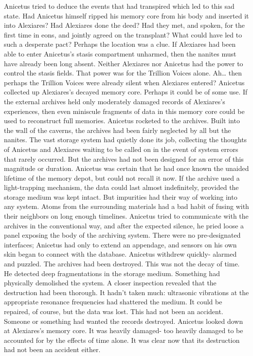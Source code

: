\documentclass[a4paper]{article}
\begin{document}
Anicetus tried to deduce the events that had transpired which led to this sad state. Had Anicetus himself ripped his memory core from his body and inserted it into Alexiares? Had Alexiares done the deed? Had they met, and spoken, for the first time in eons, and jointly agreed on the transplant? What could have led to such a desperate pact?
Perhaps the location was a clue. If Alexiares had been able to enter Anicetus’s stasis compartment unharmed, then the nanites must have already been long absent. Neither Alexiares nor Anicetus had the power to control the stasis fields. That power was for the Trillion Voices alone. Ah… then perhaps the Trillion Voices were already silent when Alexiares entered?
Anicetus collected up Alexiares’s decayed memory core. Perhaps it could be of some use. If the external archives held only moderately damaged records of Alexiares’s experiences, then even miniscule fragments of data in this memory core could be used to reconstruct full memories.
Anicetus rocketed to the archives. Built into the wall of the caverns, the archives had been fairly neglected by all but the nanites. The vast storage system had quietly done its job, collecting the thoughts of Anicetus and Alexiares waiting to be called on in the event of system errors that rarely occurred.
But the archives had not been designed for an error of this magnitude or duration. Anicetus was certain that he had once known the unaided lifetime of the memory depot, but could not recall it now. If the archive used a light-trapping mechanism, the data could last almost indefinitely, provided the storage medium was kept intact. But impurities had their way of working into any system. Atoms from the surrounding materials had a bad habit of fusing with their neighbors on long enough timelines.
Anicetus tried to communicate with the archives in the conventional way, and after the expected silence, he pried loose a panel exposing the body of the archiving system. There were no pre-designated interfaces; Anicetus had only to extend an appendage, and sensors on his own skin began to connect with the database.
Anicetus withdrew quickly- alarmed and puzzled. The archives had been destroyed. This was not the decay of time. He detected deep fragmentations in the storage medium. Something had physically demolished the system.
A closer inspection revealed that the destruction had been thorough. It hadn’t taken much: ultrasonic vibrations at the appropriate resonance frequencies had shattered the medium. It could be repaired, of course, but the data was lost. This had not been an accident. Someone or something had wanted the records destroyed. Anicetus looked down at Alexiares’s memory core. It was heavily damaged- too heavily damaged to be accounted for by the effects of time alone. It was clear now that its destruction had not been an accident either.
\end{document}
